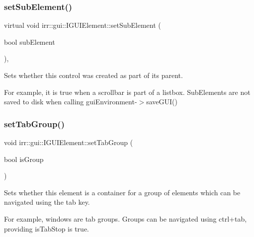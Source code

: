\subsubsection{\texorpdfstring{set\+Sub\+Element()}{setSubElement()}}
{\footnotesize\ttfamily virtual void irr\+::gui\+::\+I\+G\+U\+I\+Element\+::set\+Sub\+Element (\begin{DoxyParamCaption}\item[{bool}]{sub\+Element }\end{DoxyParamCaption})\hspace{0.3cm}{\ttfamily [inline]}, {\ttfamily [virtual]}}



Sets whether this control was created as part of its parent. 

For example, it is true when a scrollbar is part of a listbox. Sub\+Elements are not saved to disk when calling gui\+Environment-\/$>$save\+G\+U\+I() \mbox{\label{classirr_1_1gui_1_1IGUIElement_aa44a46f3b639ca1b095f855c9d9c959d}} 
\subsubsection{\texorpdfstring{set\+Tab\+Group()}{setTabGroup()}}
{\footnotesize\ttfamily void irr\+::gui\+::\+I\+G\+U\+I\+Element\+::set\+Tab\+Group (\begin{DoxyParamCaption}\item[{bool}]{is\+Group }\end{DoxyParamCaption})\hspace{0.3cm}{\ttfamily [inline]}}



Sets whether this element is a container for a group of elements which can be navigated using the tab key. 

For example, windows are tab groups. Groups can be navigated using ctrl+tab, providing is\+Tab\+Stop is true. \mbox{\label{classirr_1_1gui_1_1IGUIElement_a1aabac2cce7847e5ab17f6c88d129ef7}} 
